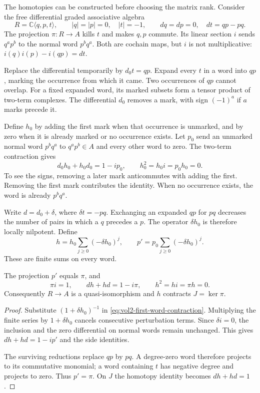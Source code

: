The homotopies can be constructed before choosing the matrix rank.
Consider the free differential graded associative algebra
\begin{equation}\label{eq:vol2-plane-resolution}
 R=\mathbb C\langle q,p,t\rangle,\qquad
 |q|=|p|=0,\quad |t|=-1,
 \qquad dq=dp=0,\quad dt=qp-pq.
\end{equation}
The projection $\pi:R\to A$ kills $t$ and makes $q,p$ commute.
Its linear section $i$ sends $q^ap^b$ to the normal word $p^bq^a$.
Both are cochain maps, but $i$ is not multiplicative:
$i(q)i(p)-i(qp)=dt$.

Replace the differential temporarily by $d_0t=qp$. Expand every
$t$ in a word into $qp$, marking the occurrence from which it
came. Two occurrences of $qp$ cannot overlap. For a fixed
expanded word, its marked subsets form a tensor product of
two-term complexes. The differential $d_0$ removes a mark, with
sign $(-1)^a$ if $a$ marks precede it.

Define $h_0$ by adding the first mark when that occurrence is
unmarked, and by zero when it is already marked or no occurrence
exists. Let $p_0$ send an unmarked normal word $p^bq^a$ to
$q^ap^b\in A$ and every other word to zero. The two-term
contraction gives
\begin{equation}\label{eq:vol2-first-word-contraction}
 d_0h_0+h_0d_0=1-ip_0,
 \qquad h_0^2=h_0i=p_0h_0=0.
\end{equation}
To see the signs, removing a later mark anticommutes with adding
the first. Removing the first mark contributes the identity.
When no occurrence exists, the word is already $p^bq^a$.

Write $d=d_0+\delta$, where $\delta t=-pq$. Exchanging an
expanded $qp$ for $pq$ decreases the number of pairs in which a
$q$ precedes a $p$. The operator $\delta h_0$ is therefore locally
nilpotent. Define
\begin{equation}\label{eq:vol2-word-contraction}
 h=h_0\sum_{j\geq0}(-\delta h_0)^j,
 \qquad p'=p_0\sum_{j\geq0}(-\delta h_0)^j.
\end{equation}
These are finite sums on every word.

\begin{proposition}\label{prop:vol2-plane-word-resolution}
The projection $p'$ equals $\pi$, and
\[
 \pi i=1,\qquad dh+hd=1-i\pi,
 \qquad h^2=hi=\pi h=0.
\]
Consequently $R\to A$ is a quasi-isomorphism and $h$ contracts
$J=\ker\pi$.
\end{proposition}
\begin{proof}
Substitute $(1+\delta h_0)^{-1}$ in
\eqref{eq:vol2-first-word-contraction}. Multiplying the finite
series by $1+\delta h_0$ cancels consecutive perturbation terms.
Since $\delta i=0$, the inclusion and the zero differential on
normal words remain unchanged. This gives
$dh+hd=1-ip'$ and the side identities.

The surviving reductions replace $qp$ by $pq$. A degree-zero
word therefore projects to its commutative monomial; a word
containing $t$ has negative degree and projects to zero. Thus
$p'=\pi$. On $J$ the homotopy identity becomes $dh+hd=1$.
\end{proof}

